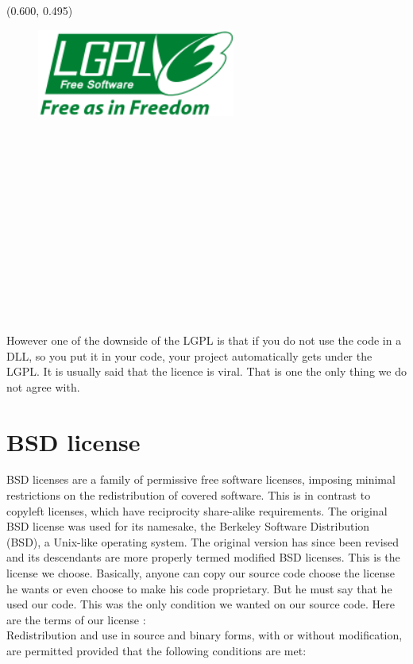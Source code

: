\documentclass[article]{report}         %
\begin{document}
          \begin{textblock}{0.628}(0.600, 0.495)
            \begin{figure}
              \includegraphics[width=6.5cm]{images/LGPL.png}
            \end{figure}
          \end{textblock}
          ~\\~\\~\\~\\~\\~\\~\\~\\~\\~\\~\\~\\~\\
          However one of the downside of the LGPL is that if you do not use the code in a DLL, so you put it in your code, your project automatically gets under the LGPL. It is usually said that the licence is viral. That is one the only thing we do not agree with.

        \section{BSD license}
          BSD licenses are a family of permissive free software licenses, imposing minimal restrictions on the redistribution of covered software. This is in contrast to copyleft licenses, which have reciprocity share-alike requirements. The original BSD license was used for its namesake, the Berkeley Software Distribution (BSD), a Unix-like operating system. The original version has since been revised and its descendants are more properly termed modified BSD licenses.
          This is the license we choose. Basically, anyone can copy our source code choose the license he wants or even choose to make his code proprietary. But he must say that he used our code. This was the only condition we wanted on our source code.\newpage
          Here are the terms of our license : \\
          Redistribution and use in source and binary forms, with or without
          modification, are permitted provided that the following conditions are met: 
\end{document}
